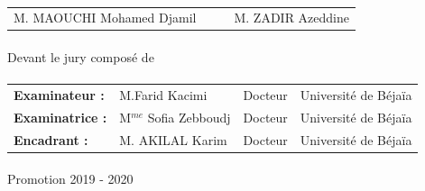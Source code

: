 \begin{titlepage}
\begin{center}
\paragraph{}

\begin{tabular}{l l l l}	

		M. MAOUCHI Mohamed Djamil 					& & & 		M. ZADIR Azeddine \\
								
			
		
		
		
\end{tabular}
		
\paragraph{}

\large Devant le jury composé de

\end{center}
  
\paragraph{}
  
\begin{table}[h!]
\begin{center}
        \begin{tabular}{l l l l}
			
				\textbf{Examinateur :} & M.Farid Kacimi & Docteur & Université de Béjaïa \\
				
				\textbf{Examinatrice :} & M$^{me}$ Sofia Zebboudj & Docteur & Université de Béjaïa \\
				
				\textbf{Encadrant :} & M. AKILAL Karim & Docteur& Université de Béjaïa \\
				
        \end{tabular}    
\end{center}

\end{table}

\paragraph{}

\begin{center} Promotion 2019 - 2020 \end{center}


\end{titlepage}
